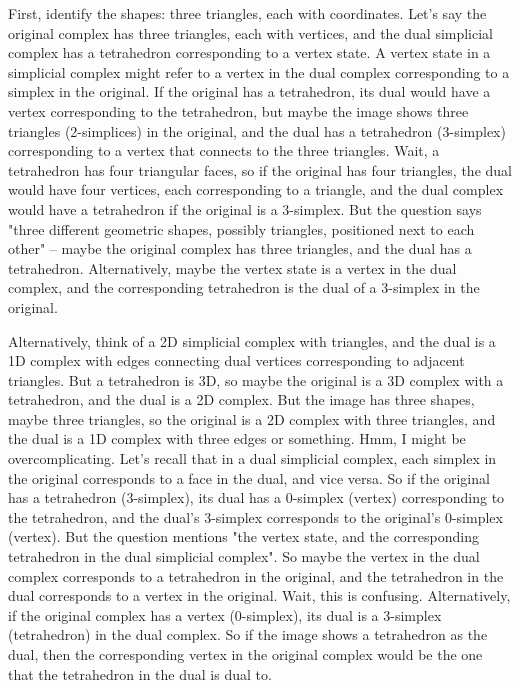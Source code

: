 First, identify the shapes: three triangles, each with coordinates. Let's say the original complex has three triangles, each with vertices, and the dual simplicial complex has a tetrahedron corresponding to a vertex state. A vertex state in a simplicial complex might refer to a vertex in the dual complex corresponding to a simplex in the original. If the original has a tetrahedron, its dual would have a vertex corresponding to the tetrahedron, but maybe the image shows three triangles (2-simplices) in the original, and the dual has a tetrahedron (3-simplex) corresponding to a vertex that connects to the three triangles. Wait, a tetrahedron has four triangular faces, so if the original has four triangles, the dual would have four vertices, each corresponding to a triangle, and the dual complex would have a tetrahedron if the original is a 3-simplex. But the question says "three different geometric shapes, possibly triangles, positioned next to each other" – maybe the original complex has three triangles, and the dual has a tetrahedron. Alternatively, maybe the vertex state is a vertex in the dual complex, and the corresponding tetrahedron is the dual of a 3-simplex in the original. 

Alternatively, think of a 2D simplicial complex with triangles, and the dual is a 1D complex with edges connecting dual vertices corresponding to adjacent triangles. But a tetrahedron is 3D, so maybe the original is a 3D complex with a tetrahedron, and the dual is a 2D complex. But the image has three shapes, maybe three triangles, so the original is a 2D complex with three triangles, and the dual is a 1D complex with three edges or something. Hmm, I might be overcomplicating. Let's recall that in a dual simplicial complex, each simplex in the original corresponds to a face in the dual, and vice versa. So if the original has a tetrahedron (3-simplex), its dual has a 0-simplex (vertex) corresponding to the tetrahedron, and the dual's 3-simplex corresponds to the original's 0-simplex (vertex). But the question mentions "the vertex state, and the corresponding tetrahedron in the dual simplicial complex". So maybe the vertex in the dual complex corresponds to a tetrahedron in the original, and the tetrahedron in the dual corresponds to a vertex in the original. Wait, this is confusing. Alternatively, if the original complex has a vertex (0-simplex), its dual is a 3-simplex (tetrahedron) in the dual complex. So if the image shows a tetrahedron as the dual, then the corresponding vertex in the original complex would be the one that the tetrahedron in the dual is dual to. 

